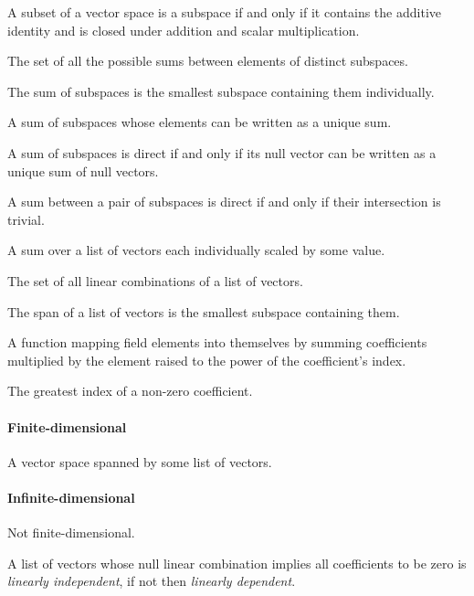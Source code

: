 \begin{multicols}{3}
  A subset of a vector space is a subspace if and only if it contains the additive identity and is closed under addition and scalar multiplication.

  The set of all the possible sums between elements of distinct subspaces.
  
  The sum of subspaces is the smallest subspace containing them individually.
  
  A sum of subspaces whose elements can be written as a unique sum.
  
  A sum of subspaces is direct if and only if its null vector can be written as a unique sum of null vectors.

  A sum between a pair of subspaces is direct if and only if their intersection is trivial.

  A sum over a list of vectors each individually scaled by some value.
  
  The set of all linear combinations of a list of vectors.
  
  The span of a list of vectors is the smallest subspace containing them.

  A function mapping field elements into themselves by summing coefficients multiplied by the element raised to the power of the coefficient's index.
  
  The greatest index of a non-zero coefficient.
  
  \paragraph{\textbf{Finite-dimensional}}
  A vector space spanned by some list of vectors.
  \paragraph{\textbf{Infinite-dimensional}}
  Not finite-dimensional.
  
  A list of vectors whose null linear combination implies all coefficients to be zero is \textit{linearly independent},
  if not then \textit{linearly dependent}.


\end{multicols}
